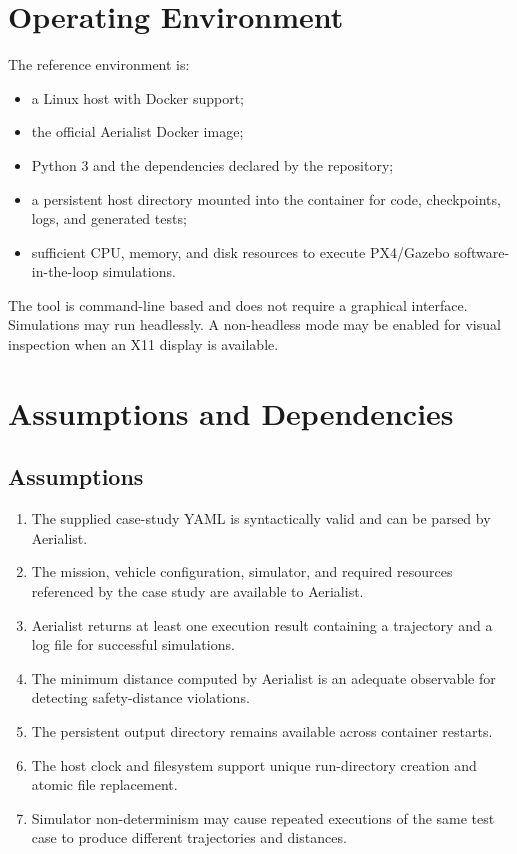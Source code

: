 \documentclass[11pt,a4paper,openany]{report}
\begin{document}
\section{Operating Environment}
The reference environment is:
\begin{itemize}
  \item a Linux host with Docker support;
  \item the official Aerialist Docker image;
  \item Python 3 and the dependencies declared by the repository;
  \item a persistent host directory mounted into the container for code, checkpoints, logs, and generated tests;
  \item sufficient CPU, memory, and disk resources to execute PX4/Gazebo software-in-the-loop simulations.
\end{itemize}

The tool is command-line based and does not require a graphical interface. Simulations may run headlessly. A non-headless mode may be enabled for visual inspection when an X11 display is available.

\section{Assumptions and Dependencies}
\subsection{Assumptions}
\begin{enumerate}[label=\textbf{A-\arabic*:}]
  \item The supplied case-study YAML is syntactically valid and can be parsed by Aerialist.
  \item The mission, vehicle configuration, simulator, and required resources referenced by the case study are available to Aerialist.
  \item Aerialist returns at least one execution result containing a trajectory and a log file for successful simulations.
  \item The minimum distance computed by Aerialist is an adequate observable for detecting safety-distance violations.
  \item The persistent output directory remains available across container restarts.
  \item The host clock and filesystem support unique run-directory creation and atomic file replacement.
  \item Simulator non-determinism may cause repeated executions of the same test case to produce different trajectories and distances.
\end{enumerate}
\end{document}
